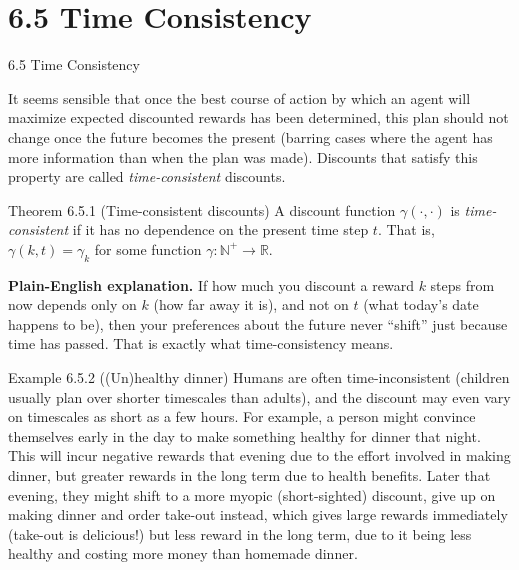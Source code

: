 \documentclass[aspectratio=169,10pt]{beamer}
\begin{document}
\section{6.5 Time Consistency}

\begin{frame}[allowframebreaks]{6.5 Time Consistency}

It seems sensible that once the best course of action by which an agent
will maximize expected discounted rewards has been determined, this plan
should not change once the future becomes the present (barring cases where
the agent has more information than when the plan was made). Discounts
that satisfy this property are called \emph{time-consistent} discounts.

\begin{block}{Theorem 6.5.1 (Time-consistent discounts)}
A discount function $\gamma(\cdot,\cdot)$ is \emph{time-consistent} if it
has no dependence on the present time step $t$. That is, $\gamma(k,t) =
\gamma_k$ for some function $\gamma: \mathbb{N}^+ \to \mathbb{R}$.
\end{block}

\textbf{Plain-English explanation.} If how much you discount a reward $k$
steps from now depends only on $k$ (how far away it is), and not on $t$
(what today's date happens to be), then your preferences about the future
never ``shift'' just because time has passed. That is exactly what
time-consistency means.

\framebreak

\begin{block}{Example 6.5.2 ((Un)healthy dinner)}
Humans are often time-inconsistent (children usually plan over shorter
timescales than adults), and the discount may even vary on timescales as
short as a few hours. For example, a person might convince themselves
early in the day to make something healthy for dinner that night. This
will incur negative rewards that evening due to the effort involved in
making dinner, but greater rewards in the long term due to health benefits.
Later that evening, they might shift to a more myopic (short-sighted)
discount, give up on making dinner and order take-out instead, which gives
large rewards immediately (take-out is delicious!) but less reward in the
long term, due to it being less healthy and costing more money than
homemade dinner.
\end{block}


\end{frame}
\end{document}
